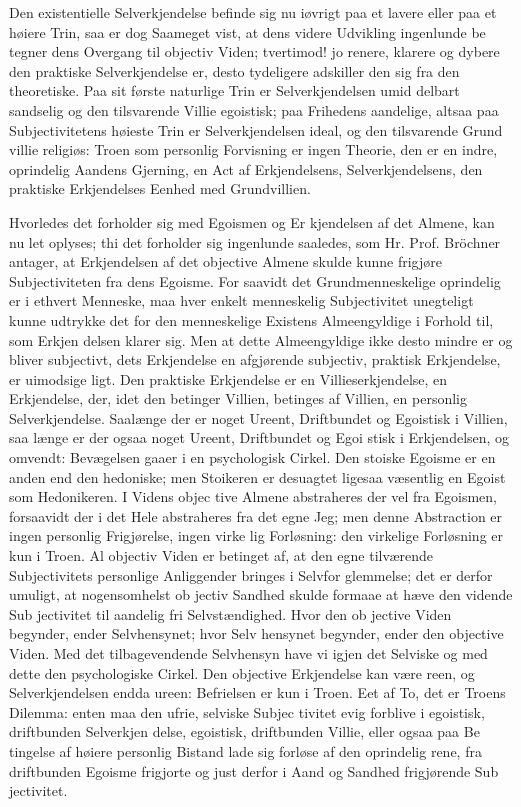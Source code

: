 \documentclass[12pt]{book}
\newcommand{\opage}[1]{\marginnote{\footnotesize\textit{[#1]}}}
\begin{document}
Den existentielle Selverkjendelse befinde sig nu
\opage{17}\setcounter{footnote}{0}%
iøvrigt paa et lavere eller paa et høiere Trin, saa er dog
Saameget vist, at dens videre Udvikling ingenlunde be\-%
tegner dens Overgang til objectiv Viden; tvertimod! jo
renere, klarere og dybere den praktiske Selverkjendelse
er, desto tydeligere adskiller den sig fra den theoretiske.
Paa sit første naturlige Trin er Selverkjendelsen umid\-%
delbart sandselig og den tilsvarende Villie egoistisk; paa
Frihedens aandelige, altsaa paa Subjectivitetens høieste
Trin er Selverkjendelsen ideal, og den tilsvarende Grund\-%
villie religiøs: Troen som personlig Forvisning er ingen
Theorie, den er en indre, oprindelig Aandens Gjerning,
en Act af Erkjendelsens, Selverkjendelsens, den praktiske
Erkjendelses Eenhed med Grundvillien.

Hvorledes det forholder sig med Egoismen og Er\-%
kjendelsen af det Almene, kan nu let oplyses; thi det
forholder sig ingenlunde saaledes, som Hr. Prof. Bröchner
antager, at Erkjendelsen af det objective Almene skulde
kunne frigjøre Subjectiviteten fra dens Egoisme. For\-%
saavidt det Grundmenneskelige oprindelig er i ethvert
Menneske, maa hver enkelt menneskelig Subjectivitet
unegteligt kunne udtrykke det for den menneskelige
Existens Almeengyldige i Forhold til, som Erkjen\-%
delsen klarer sig. Men at dette Almeengyldige ikke
desto mindre er og bliver subjectivt, dets Erkjendelse en
afgjørende subjectiv, praktisk Erkjendelse, er uimodsige\-%
ligt. Den praktiske Erkjendelse er en Villieserkjendelse,
en Erkjendelse, der, idet den betinger Villien, betinges
af Villien, en personlig Selverkjendelse. Saalænge der
er noget Ureent, Driftbundet og Egoistisk i Villien, saa\-%
længe er der ogsaa noget Ureent, Driftbundet og Egoi\-%
stisk i Erkjendelsen, og omvendt: Bevægelsen gaaer i en
psychologisk Cirkel. Den stoiske Egoisme er en anden
end den hedoniske; men Stoikeren er desuagtet ligesaa
væsentlig en Egoist som Hedonikeren. I Videns objec\-%
\opage{18}\setcounter{footnote}{0}%
tive Almene abstraheres der vel fra Egoismen, forsaavidt
der i det Hele abstraheres fra det egne Jeg; men denne
Abstraction er ingen personlig Frigjørelse, ingen virke\-%
lig Forløsning: den virkelige Forløsning er kun i Troen.
Al objectiv Viden er betinget af, at den egne tilværende
Subjectivitets personlige Anliggender bringes i Selvfor\-%
glemmelse; det er derfor umuligt, at nogensomhelst ob\-%
jectiv Sandhed skulde formaae at hæve den vidende Sub\-%
jectivitet til aandelig fri Selvstændighed. Hvor den ob\-%
jective Viden begynder, ender Selvhensynet; hvor Selv\-%
hensynet begynder, ender den objective Viden. Med
det tilbagevendende Selvhensyn have vi igjen det Selviske
og med dette den psychologiske Cirkel. Den objective
Erkjendelse kan være reen, og Selverkjendelsen endda
ureen: Befrielsen er kun i Troen. Eet af To, det er
Troens Dilemma: enten maa den ufrie, selviske Subjec\-%
tivitet evig forblive i egoistisk, driftbunden Selverkjen\-%
delse, egoistisk, driftbunden Villie, eller ogsaa paa Be\-%
tingelse af høiere personlig Bistand lade sig forløse af
den oprindelig rene, fra driftbunden Egoisme frigjorte
og just derfor i Aand og Sandhed frigjørende Sub\-%
jectivitet.
\end{document}
